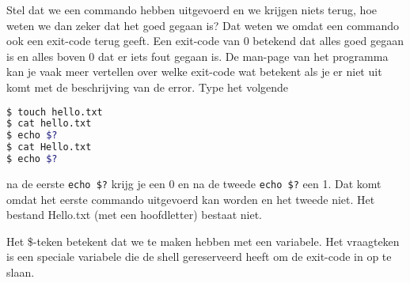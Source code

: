 Stel dat we een commando hebben uitgevoerd en we krijgen niets terug, hoe weten we dan zeker dat het goed gegaan is? Dat weten we omdat een commando ook een exit{}-code terug geeft. Een exit{}-code van 0 betekend dat alles goed gegaan is en alles boven 0 dat er iets fout gegaan is. De man-page van het programma kan je vaak meer vertellen over welke exit{}-code wat betekent als je er niet uit komt met de beschrijving van de error. Type het volgende
\begin{lstlisting}[language=bash]
$ touch hello.txt
$ cat hello.txt
$ echo $?
$ cat Hello.txt
$ echo $?
\end{lstlisting}
na de eerste \texttt{echo \$?} krijg je een 0 en na de tweede \texttt{echo \$?} een 1. Dat komt omdat het eerste commando uitgevoerd kan worden en het tweede niet. Het bestand Hello.txt (met een hoofdletter) bestaat niet.

Het \$-teken betekent dat we te maken hebben met een variabele. Het vraagteken is een speciale variabele die de shell gereserveerd heeft om de exit-code in op te slaan.
